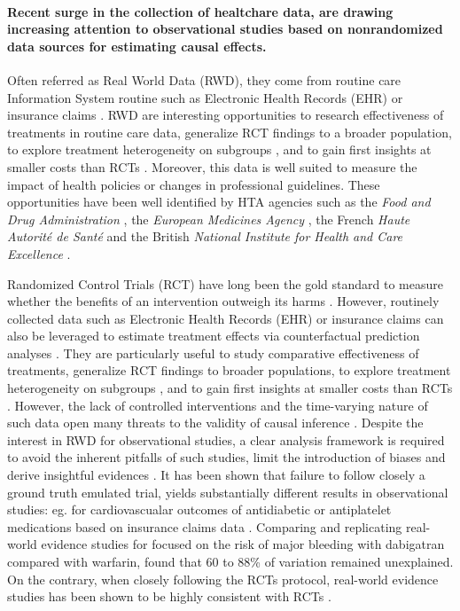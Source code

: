 
\paragraph{Recent surge in the collection of healtchare data, are drawing
    increasing attention to observational studies based on nonrandomized data
    sources for estimating causal effects.} Often referred as Real World Data
(RWD), they come from routine care Information System routine such as
Electronic Health Records (EHR) or insurance claims
\citep{wang2023emulation}. RWD are interesting opportunities to research
effectiveness of treatments in routine care data, generalize RCT findings to
a broader population, to explore treatment heterogeneity on subgroups
\citep{mant1999can, desai2021broadening}, and to gain first insights at
smaller costs than RCTs \citep{black1996we,bosdriesz2020evidence}. Moreover,
this data is well suited to measure the impact of health policies or changes
in professional guidelines. These opportunities have been well identified by
HTA agencies such as the \textit{Food and Drug Administration}
\citep{desai2021broadening,fda_real-world_2021}, the \textit{European
    Medicines Agency} \citep{flynn_marketing_2022}, the French \textit{Haute
    Autorité de Santé} \citep{vanier2023rapid} and the British \textit{National
    Institute for Health and Care Excellence} \citep{kent_nice_2022}.

%
Randomized Control Trials (RCT) have
long been the gold standard to measure whether the benefits of an intervention
outweigh its harms \citep{brook1986method}. However, routinely collected data
such as Electronic Health Records (EHR) or insurance claims
\citep{wang2023early} can also be leveraged to estimate treatment effects via
counterfactual prediction analyses \citep{hernan2019second}.  They are
particularly useful to study comparative effectiveness of treatments,
generalize RCT findings to broader populations, to explore treatment
heterogeneity on subgroups \citep{mant1999can,desai2021broadening}, and to
gain first insights at smaller costs than RCTs
\citep{black1996we,bosdriesz2020evidence}. However, the lack of controlled
interventions and the time-varying nature of such data open many threats to
the validity of causal inference \citep{bouvier2023should}.
Despite the interest in RWD for observational studies, a clear analysis
framework is required to avoid the inherent pitfalls of such studies, limit the
introduction of biases and derive insightful evidences \citep{hernan2019second,
    wang2023emulation}. It has been shown that failure to follow closely a ground
truth emulated trial,
yields substantially different results in observational studies: eg. for
cardiovascualar outcomes of antidiabetic or antiplatelet medications based on
insurance claims data \citep{schneeweiss2021conducting}. Comparing and
replicating real-world evidence studies for focused on the risk of major
bleeding
with dabigatran compared with warfarin, \cite{wang2022understanding} found that
60 to 88\% of variation remained unexplained. On the contrary, when closely
following the RCTs protocol, real-world evidence studies has been shown to be
highly consistent with RCTs \citep{wang2023emulation}.